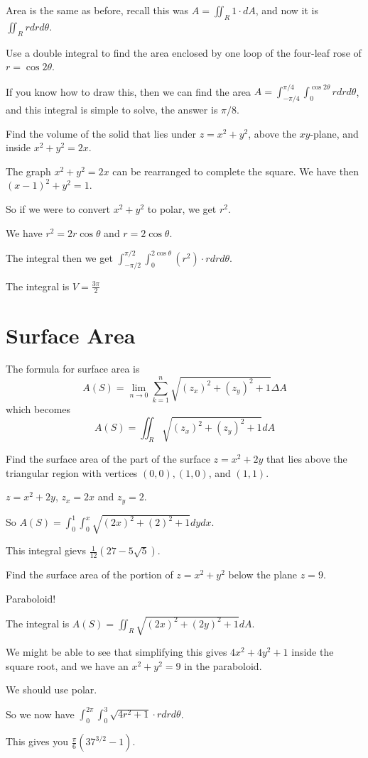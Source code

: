 \documentclass[../calc3.tex]{subfiles}
\begin{document}
Area is the same as before, recall this was $A=\iint_R 1\cdot dA$, and now it is $\iint_R r dr d\theta$.

\begin{example}
    Use a double integral to find the area enclosed by one loop of the four-leaf rose of $r=\cos2\theta$.

    If you know how to draw this, then we can find the area $A=\int_{-\pi/4}^{\pi/4}\int_0^{\cos 2\theta}rdrd\theta$, and this integral is simple to solve, the answer is $\pi/8$.
\end{example}

\begin{example}
    Find the volume of the solid that lies under $z=x^2+y^2$, above the $xy$-plane, and inside $x^2+y^2=2x$.

    The graph $x^2+y^2=2x$ can be rearranged to complete the square. We have then $(x-1)^2+y^2=1$.

    So if we were to convert $x^2+y^2$ to polar, we get $r^2$.

    We have $r^2=2r\cos\theta$ and $r=2\cos\theta$.

    The integral then we get $\int_{-\pi/2}^{\pi/2} \int_0^{2\cos\theta} (r^2)\cdot rdrd\theta$.

    The integral is $V=\frac{3\pi}{2}$
\end{example}

\section{Surface Area}
The formula for surface area is 
\[ A(S)=\lim_{n\to 0}\sum_{k=1}^n \sqrt{(z_x)^2+(z_y)^2+1}\Delta A\]
which becomes 
\[ A(S)=\iint_R \sqrt{(z_x)^2+(z_y)^2+1}dA \]

\begin{example}
    Find the surface area of the part of the surface $z=x^2+2y$ that lies above the triangular region with vertices $(0,0), (1,0)$, and $(1,1)$.

    $z=x^2+2y$, $z_x=2x$ and $z_y=2$.

    So $A(S)=\int_0^1 \int_0^x \sqrt{(2x)^2+(2)^2+1} dydx$.

    This integral gievs $\frac{1}{12}(27-5\sqrt{5})$.
\end{example}

\begin{example}
    Find the surface area of the portion of $z=x^2+y^2$ below the plane $z=9$.

    Paraboloid!

    The integral is $A(S)=\iint_R \sqrt{(2x)^2+(2y)^2+1}dA$.

    We might be able to see that simplifying this gives $4x^2+4y^2+1$ inside the square root, and we have an $x^2+y^2=9$ in the paraboloid.

    We should use polar.

    So we now have $\int_0^{2\pi}\int_0^3 \sqrt{4r^2+1}\cdot r dr d\theta$.

    This gives you $\frac{\pi}{6}(37^{3/2}-1)$.
\end{example}
\end{document}
